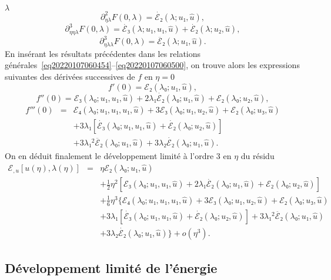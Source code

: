 \documentclass{article}
\begin{document}
$λ$
\begin{equation}
  \partial_{η  λ}^2 F (0, λ) = \dot{ℰ₂}
  (λ ; u₁, \hat{u}),
\end{equation}
\begin{equation}
  \partial_{η  η  λ}^3 F (0, λ) =
  \dot{ℰ₃} (λ ; u₁, u₁, \hat{u}) + \dot{ℰ₂}
  (λ ; u₂, \hat{u}),
\end{equation}
\begin{equation}
  \partial_{η  λ  λ}^3 F (0, λ) =
  \ddot{ℰ₂} (λ ; u₁, \hat{u}) .
\end{equation}
En insérant les résultats précédentes dans les relations
générales~\eqref{eq20220107060454}--\eqref{eq20220107060500}, on
trouve alors les expressions suivantes des dérivées successives de $f$
en $η = 0$
\begin{equation}
  f' (0) =ℰ₂ (λ₀ ; u₁, \hat{u}),
\end{equation}
\begin{equation}
  f'' (0) =ℰ₃ (λ₀ ; u₁, u₁, \hat{u}) + 2 λ₁
  \dot{ℰ₂} (λ₀ ; u₁, \hat{u}) +ℰ₂ (λ₀ ;
  u₂, \hat{u}),
\end{equation}
\begin{eqnarray}
  f''' (0) & = & ℰ₄ (λ₀ ; u₁, u₁, u₁, \hat{u}) +
  3ℰ₃ (λ₀ ; u₁, u₂, \hat{u}) +ℰ₂ (λ₀ ;
  u₃, \hat{u}) \nonumber\\
  &  &  + 3 λ₁  [\dot{ℰ₃} (λ₀ ; u₁, u₁,
  \hat{u}) + \dot{ℰ₂} (λ₀ ; u₂, \hat{u})] \nonumber\\
  &  &  + 3 λ₁^2  \ddot{ℰ₂} (λ₀ ; u₁,
  \hat{u}) + 3 λ₂  \dot{ℰ₂} (λ₀ ; u₁, \hat{u}) .
\end{eqnarray}
On en déduit finalement le développement limité à l'ordre 3 en
$η$ du résidu
\begin{eqnarray}
  ℰ_{, u} [u (η), λ (η)] & = & η ℰ₂
  (λ₀ ; u₁, \hat{u}) \nonumber\\
  &  &  + \tfrac{1}{2} η^2  [ℰ₃ (λ₀ ; u₁, u₁,
  \hat{u}) + 2 λ₁  \dot{ℰ₂} (λ₀ ; u₁, \hat{u})
  +ℰ₂ (λ₀ ; u₂, \hat{u})] \nonumber\\
  &  &  + \tfrac{1}{6} η^3  \{ ℰ₄ (λ₀ ; u₁,
  u₁, u₁, \hat{u}) + 3ℰ₃ (λ₀ ; u₁, u₂, \hat{u})
   +ℰ₂ (λ₀ ; u₃, \hat{u}) \nonumber\\
  &  &  + 3 λ₁  [\dot{ℰ₃} (λ₀ ; u₁, u₁,
  \hat{u}) + \dot{ℰ₂} (λ₀ ; u₂, \hat{u})] + 3 λ₁^2
  \ddot{ℰ₂} (λ₀ ; u₁, \hat{u}) \nonumber\\
  &  &   + 3 λ₂  \dot{ℰ₂} (λ₀ ;
  u₁, \hat{u}) \} + o (η^3) .  \label{eq20220107080901}
\end{eqnarray}
\subsection{Développement limité de l'énergie}\label{sec:DL
energie}
\end{document}
